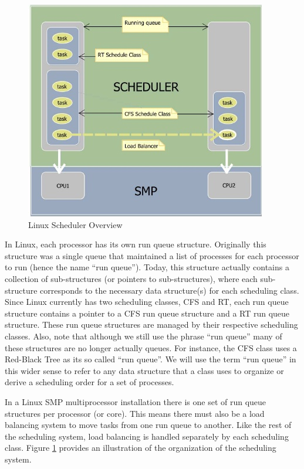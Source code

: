 \documentclass[12pt]{article}
\begin{document}
\begin{figure}[htbp]
  \begin{center}
    \includegraphics[scale=.75]{LinuxSchedulerOverview.jpg}
    \caption{Linux Scheduler Overview \cite{Le-StudyLKS}}
    \label{fig:LSOverview}
  \end{center}
\end{figure}

In Linux, each processor has its own run queue structure. Originally this
structure was a single queue that maintained a list of processes for
each processor to run (hence the name ``run queue'').
Today, this structure actually contains a collection of
sub-structures (or pointers to sub-structures),
where each sub-structure corresponds to the necessary
data structure(s) for each scheduling class. Since Linux currently
has two scheduling classes, CFS and RT, each run queue structure
contains a pointer to a CFS run queue structure and a RT run queue
structure. These
run queue structures are managed by their respective scheduling
classes. Also, note that although we still use the phrase ``run queue''
many of these structures are no longer actually queues. For instance, the CFS
class uses a Red-Black Tree as its so called ``run queue''. We will
use the term ``run queue'' in this wider sense to refer to any data
structure that a class uses to organize or derive a scheduling order for a
set of processes.

In a Linux SMP multiprocessor installation there is one set of run queue
structures per processor (or core). This means there must also be
a load balancing system
to move tasks from one run queue to another. Like the rest of the
scheduling system, load balancing is handled separately by each
scheduling class. Figure \ref{fig:LSOverview} provides an illustration
of the organization of the scheduling system.
\end{document}
